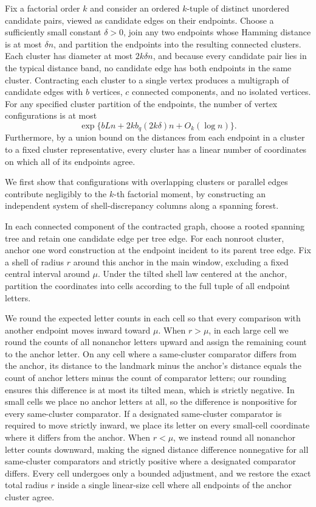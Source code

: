 Fix a factorial order \(k\) and consider an ordered \(k\)-tuple of distinct unordered candidate pairs, viewed as candidate edges on their endpoints. Choose a sufficiently small constant \(\delta>0\), join any two endpoints whose Hamming distance is at most \(\delta n\), and partition the endpoints into the resulting connected clusters. Each cluster has diameter at most \(2k\delta n\), and because every candidate pair lies in the typical distance band, no candidate edge has both endpoints in the same cluster. Contracting each cluster to a single vertex produces a multigraph of candidate edges with \(b\) vertices, \(c\) connected components, and no isolated vertices. For any specified cluster partition of the endpoints, the number of vertex configurations is at most
\[
 \exp\{bLn+2k b_q(2k\delta)n+O_k(\log n)\}.
\]
Furthermore, by a union bound on the distances from each endpoint in a cluster to a fixed cluster representative, every cluster has a linear number of coordinates on which all of its endpoints agree.

We first show that configurations with overlapping clusters or parallel edges contribute negligibly to the \(k\)-th factorial moment, by constructing an independent system of shell-discrepancy columns along a spanning forest.

In each connected component of the contracted graph, choose a rooted spanning tree and retain one candidate edge per tree edge. For each nonroot cluster, anchor one word construction at the endpoint incident to its parent tree edge. Fix a shell of radius \(r\) around this anchor in the main window, excluding a fixed central interval around \(\mu\). Under the tilted shell law centered at the anchor, partition the coordinates into cells according to the full tuple of all endpoint letters.

We round the expected letter counts in each cell so that every comparison with another endpoint moves inward toward \(\mu\). When \(r>\mu\), in each large cell we round the counts of all nonanchor letters upward and assign the remaining count to the anchor letter. On any cell where a same-cluster comparator differs from the anchor, its distance to the landmark minus the anchor's distance equals the count of anchor letters minus the count of comparator letters; our rounding ensures this difference is at most its tilted mean, which is strictly negative. In small cells we place no anchor letters at all, so the difference is nonpositive for every same-cluster comparator. If a designated same-cluster comparator is required to move strictly inward, we place its letter on every small-cell coordinate where it differs from the anchor. When \(r<\mu\), we instead round all nonanchor letter counts downward, making the signed distance difference nonnegative for all same-cluster comparators and strictly positive where a designated comparator differs. Every cell undergoes only a bounded adjustment, and we restore the exact total radius \(r\) inside a single linear-size cell where all endpoints of the anchor cluster agree.

